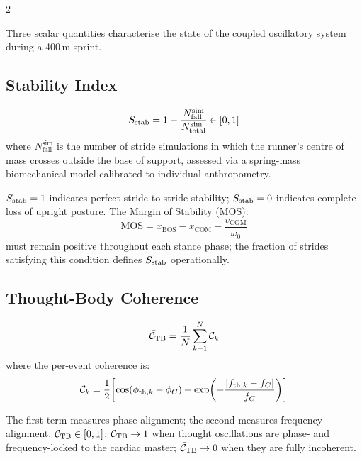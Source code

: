 \begin{multicols}{2}

Three scalar quantities characterise the state of the coupled oscillatory system during a 400\,m sprint.

\subsection{Stability Index}

\begin{definition}
\begin{equation}
S_{\mathrm{stab}} = 1 - \frac{N_{\mathrm{fall}}^{\mathrm{sim}}}{N_{\mathrm{total}}^{\mathrm{sim}}} \in [0,1]
\end{equation}
where $N_{\mathrm{fall}}^{\mathrm{sim}}$ is the number of stride simulations in which the runner's centre of mass crosses outside the base of support, assessed via a spring-mass biomechanical model calibrated to individual anthropometry.
\end{definition}

$S_{\mathrm{stab}} = 1$ indicates perfect stride-to-stride stability; $S_{\mathrm{stab}} = 0$ indicates complete loss of upright posture. The Margin of Stability (MOS):
\begin{equation}
\mathrm{MOS} = x_{\mathrm{BOS}} - x_{\mathrm{COM}} - \frac{v_{\mathrm{COM}}}{\omega_0}
\end{equation}
must remain positive throughout each stance phase; the fraction of strides satisfying this condition defines $S_{\mathrm{stab}}$ operationally.

\subsection{Thought-Body Coherence}

\begin{definition}
\begin{equation}
\bar{\mathcal{C}}_{\mathrm{TB}} = \frac{1}{N}\sum_{k=1}^{N} \mathcal{C}_k
\end{equation}
where the per-event coherence is:
\begin{equation}
\mathcal{C}_k = \frac{1}{2}\!\left[\cos(\phi_{\mathrm{th},k} - \phi_C) + \exp\!\left(-\frac{|f_{\mathrm{th},k} - f_C|}{f_C}\right)\right]
\end{equation}
\end{definition}

The first term measures phase alignment; the second measures frequency alignment. $\bar{\mathcal{C}}_{\mathrm{TB}} \in [0,1]$: $\bar{\mathcal{C}}_{\mathrm{TB}} \to 1$ when thought oscillations are phase- and frequency-locked to the cardiac master; $\bar{\mathcal{C}}_{\mathrm{TB}} \to 0$ when they are fully incoherent.


\end{multicols}
